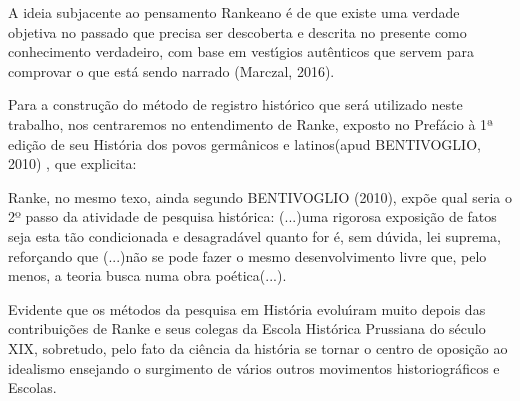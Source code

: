 \documentclass[
12pt,		%
openright,	%
twoside,  %
a4paper,			%
chapter=TITLE,		%
english,			%
french,				%
spanish,			%
brazil				%
]{USPSC-classe/USPSC_RedarTex}
\begin{document}
A ideia subjacente ao pensamento Rankeano \'e de que existe uma verdade objetiva no passado que precisa ser descoberta e descrita no presente como \textquotedbl conhecimento verdadeiro\textquotedbl , com base em vest\'{\i}gios aut\^enticos que servem para comprovar o que est\'a sendo narrado (Marczal, 2016).










Para a constru\c{c}\~ao do m\'etodo de registro hist\'orico que ser\'a utilizado neste trabalho, nos centraremos no entendimento de Ranke, exposto no Pref\'acio \`a 1ª edi\c{c}\~ao de seu \textquotedbl Hist\'oria dos povos germ\^anicos e latinos\textquotedbl   (apud BENTIVOGLIO, 2010) , que explicita:











\noindent\begin{center}\mbox{\centering{}}\end{center}


Ranke, no mesmo texo, ainda segundo  BENTIVOGLIO (2010), exp\~oe qual seria o 2º passo da atividade de pesquisa hist\'orica: \textquotedbl (...)uma rigorosa exposi\c{c}\~ao de fatos seja esta t\~ao condicionada e desagrad\'avel quanto for \'e, sem d\'uvida, lei suprema\textquotedbl , refor\c{c}ando que \textquotedbl (...)n\~ao se pode fazer o mesmo desenvolvimento livre que, pelo menos, a teoria busca numa obra po\'etica(...)\textquotedbl .










Evidente que os m\'etodos da pesquisa em Hist\'oria evolu\'{\i}ram muito depois das contribui\c{c}\~oes de Ranke e seus colegas da Escola Hist\'orica Prussiana do s\'eculo XIX, sobretudo, pelo fato da ci\^encia  da hist\'oria se tornar o centro de oposi\c{c}\~ao ao idealismo ensejando o surgimento de v\'arios outros movimentos historiogr\'aficos e Escolas.
\end{document}
